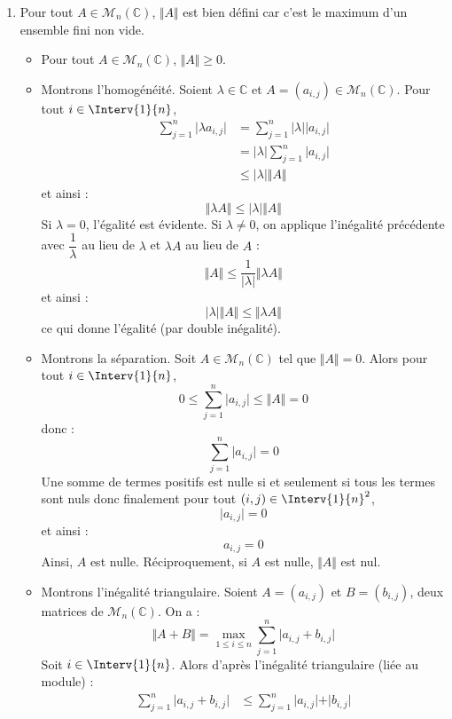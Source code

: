 \documentclass[a4paper,10pt]{report}
\begin{document}
\corr 

\begin{enumerate}
\item Pour tout $A \in \mathcal{M}_n(\mathbb{C})$, $\Vert A \Vert$ est bien défini car c'est le maximum d'un ensemble fini non vide.

\begin{itemize}
\item Pour tout $A \in \mathcal{M}_n(\mathbb{C})$, $\Vert A \Vert \geq 0$.
\item Montrons l'homogénéité. Soient $\lambda \in \mathbb{C}$ et $A=(a_{i,j}) \in \mathcal{M}_n(\mathbb{C})$. Pour tout $i \in \Interv{1}{n}$,
\begin{align*}
 \sum_{j=1}^n \vert \lambda a_{i,j} \vert & =  \sum_{j=1}^n \vert \lambda \vert \vert a_{i,j} \vert \\
 & =  \vert \lambda \vert \sum_{j=1}^n \vert a_{i,j} \vert \\
 & \leq \vert \lambda \vert \Vert A \Vert
 \end{align*}
 et ainsi :
 $$ \Vert \lambda A \Vert \leq \vert \lambda \vert \Vert A \Vert$$
 Si $\lambda=0$, l'égalité est évidente. Si $\lambda \neq 0$, on applique l'inégalité précédente avec $\dfrac{1}{\lambda}$ au lieu de $\lambda$ et $\lambda A$ au lieu de $A$ :
 $$ \Vert A \Vert \leq \dfrac{1}{\vert \lambda \vert} \Vert \lambda A \Vert$$
 et ainsi :
 $$  \vert \lambda \vert \Vert A \Vert \leq \Vert \lambda A \Vert$$
 ce qui donne l'égalité (par double inégalité).
 \item Montrons la séparation. Soit $A \in \mathcal{M}_n(\mathbb{C})$ tel que $\Vert A \Vert =0$. Alors pour tout $i \in \Interv{1}{n}$,
$$ 0 \leq \sum_{j=1}^n \vert a_{i,j} \vert \leq \Vert A \Vert = 0$$
donc :
$$ \sum_{j=1}^n \vert a_{i,j} \vert = 0$$
Une somme de termes positifs est nulle si et seulement si tous les termes sont nuls donc finalement pour tout $(i,j) \in \Interv{1}{n}^2$,
$$  \vert a_{i,j} \vert = 0$$
et ainsi :
$$ a_{i,j}=0$$
Ainsi, $A$ est nulle. Réciproquement, si $A$ est nulle, $\Vert A \Vert$ est nul.
\item Montrons l'inégalité triangulaire. Soient $A=(a_{i,j})$ et $B=(b_{i,j})$, deux matrices de $\mathcal{M}_n(\mathbb{C})$. On a :
$$ \Vert A+B \Vert = \max_{1 \leq i \leq n} \sum_{j=1}^n \vert a_{i,j}+ b_{i,j} \vert$$
Soit $i \in \Interv{1}{n}$. Alors d'après l'inégalité triangulaire (liée au module) :
\begin{align*}
 \sum_{j=1}^n \vert a_{i,j}+ b_{i,j} \vert &  \leq \sum_{j=1}^n \vert a_{i,j} \vert + \vert b_{i,j} \vert \\

\end{align*}
\end{itemize}
\end{enumerate}
\end{document}
